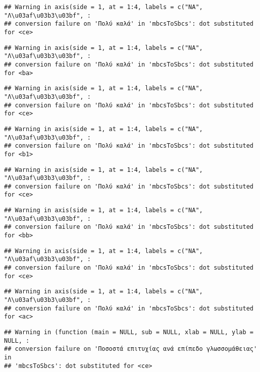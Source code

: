 \documentclass[
]{article}
\begin{document}
\begin{verbatim}
## Warning in axis(side = 1, at = 1:4, labels = c("NA", "Λ\u03af\u03b3\u03bf", :
## conversion failure on 'Πολύ καλά' in 'mbcsToSbcs': dot substituted for <ce>
\end{verbatim}

\begin{verbatim}
## Warning in axis(side = 1, at = 1:4, labels = c("NA", "Λ\u03af\u03b3\u03bf", :
## conversion failure on 'Πολύ καλά' in 'mbcsToSbcs': dot substituted for <ba>
\end{verbatim}

\begin{verbatim}
## Warning in axis(side = 1, at = 1:4, labels = c("NA", "Λ\u03af\u03b3\u03bf", :
## conversion failure on 'Πολύ καλά' in 'mbcsToSbcs': dot substituted for <ce>
\end{verbatim}

\begin{verbatim}
## Warning in axis(side = 1, at = 1:4, labels = c("NA", "Λ\u03af\u03b3\u03bf", :
## conversion failure on 'Πολύ καλά' in 'mbcsToSbcs': dot substituted for <b1>
\end{verbatim}

\begin{verbatim}
## Warning in axis(side = 1, at = 1:4, labels = c("NA", "Λ\u03af\u03b3\u03bf", :
## conversion failure on 'Πολύ καλά' in 'mbcsToSbcs': dot substituted for <ce>
\end{verbatim}

\begin{verbatim}
## Warning in axis(side = 1, at = 1:4, labels = c("NA", "Λ\u03af\u03b3\u03bf", :
## conversion failure on 'Πολύ καλά' in 'mbcsToSbcs': dot substituted for <bb>
\end{verbatim}

\begin{verbatim}
## Warning in axis(side = 1, at = 1:4, labels = c("NA", "Λ\u03af\u03b3\u03bf", :
## conversion failure on 'Πολύ καλά' in 'mbcsToSbcs': dot substituted for <ce>
\end{verbatim}

\begin{verbatim}
## Warning in axis(side = 1, at = 1:4, labels = c("NA", "Λ\u03af\u03b3\u03bf", :
## conversion failure on 'Πολύ καλά' in 'mbcsToSbcs': dot substituted for <ac>
\end{verbatim}

\begin{verbatim}
## Warning in (function (main = NULL, sub = NULL, xlab = NULL, ylab = NULL, :
## conversion failure on 'Ποσοστά επιτυχίας ανά επίπεδο γλωσσομάθειας' in
## 'mbcsToSbcs': dot substituted for <ce>
\end{verbatim}
\end{document}
